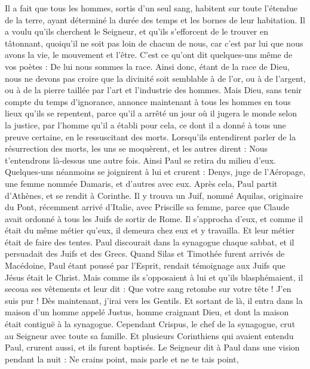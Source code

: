 \begin{multicols}{2}
Il a fait que tous les hommes, sortis d'un seul sang, habitent sur toute l'étendue de la terre, ayant déterminé la durée des temps et les bornes de leur habitation.
Il a voulu qu'ils cherchent le Seigneur, et qu'ils s'efforcent de le trouver en tâtonnant, quoiqu'il ne soit pas loin de chacun de nous,
car c'est par lui que nous avons la vie, le mouvement et l'être. C'est ce qu'ont dit quelques-uns même de vos poètes : De lui nous sommes la race.
Ainsi donc, étant de la race de Dieu, nous ne devons pas croire que la divinité soit semblable à de l'or, ou à de l'argent, ou à de la pierre taillée par l'art et l'industrie des hommes.
Mais Dieu, sans tenir compte du temps d'ignorance, annonce maintenant à tous les hommes en tous lieux qu'ils se repentent,
parce qu'il a arrêté un jour où il jugera le monde selon la justice, par l'homme qu'il a établi pour cela, ce dont il a donné à tous une preuve certaine, en le ressuscitant des morts.
Lorsqu'ils entendirent parler de la résurrection des morts, les uns se moquèrent, et les autres dirent : Nous t'entendrons là-dessus une autre fois.
Ainsi Paul se retira du milieu d'eux.
Quelques-uns néanmoins se joignirent à lui et crurent : Denys, juge de l'Aéropage, une femme nommée Damaris, et d'autres avec eux.
\VerseOne{}Après cela, Paul partit d'Athènes, et se rendit à Corinthe.
Il y trouva un Juif, nommé Aquilas, originaire du Pont, récemment arrivé d'Italie, avec Priscille sa femme, parce que Claude avait ordonné à tous les Juifs de sortir de Rome. Il s'approcha d'eux,
et comme il était du même métier qu'eux, il demeura chez eux et y travailla. Et leur métier était de faire des tentes.
Paul discourait dans la synagogue chaque sabbat, et il persuadait des Juifs et des Grecs.
Quand Silas et Timothée furent arrivés de Macédoine, Paul étant poussé par l'Esprit, rendait témoignage aux Juifs que Jésus était le Christ.
Mais comme ils s'opposaient à lui et qu'ils blasphémaient, il secoua ses vêtements et leur dit : Que votre sang retombe sur votre tête ! J'en suis pur ! Dès maintenant, j'irai vers les Gentils.
Et sortant de là, il entra dans la maison d'un homme appelé Justus, homme craignant Dieu, et dont la maison était contiguë à la synagogue.
Cependant Crispus, le chef de la synagogue, crut au Seigneur avec toute sa famille. Et plusieurs Corinthiens qui avaient entendu Paul, crurent aussi, et ils furent baptisés.
Le Seigneur dit à Paul dans une vision pendant la nuit : Ne crains point, mais parle et ne te tais point,

\end{multicols}
